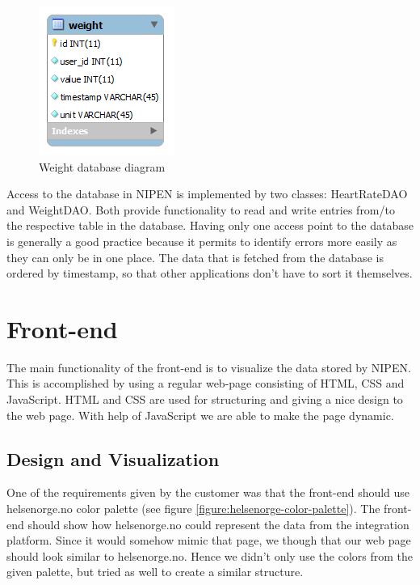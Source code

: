 \begin{figure}[h]
\centering
\includegraphics[scale=1.0]{../Figures/weight-database-diagram.png}
\caption{Weight database diagram}
\label{figure:weight-database-diagram}
\end{figure}

Access to the database in NIPEN is implemented by two classes: HeartRateDAO and WeightDAO.
Both provide functionality to read and write entries from/to the respective table in the database.
Having only one access point to the database is generally a good practice because it permits to
identify errors more easily as they can only be in one place.
The data that is fetched from the database is ordered by timestamp, so that other applications
don't have to sort it themselves.



\section{Front-end}
\label{subsec:front-end}

The main functionality of the front-end is to visualize the data stored by NIPEN.
This is accomplished by using a regular web-page consisting of HTML, CSS and JavaScript. HTML and CSS are used for structuring and giving a nice design to the web page. With help of JavaScript we are able to make the page dynamic.

\subsection{Design and Visualization}

One of the requirements given by the customer was that the front-end should use helsenorge.no color palette
(see figure \ref{figure:helsenorge-color-palette}).
The front-end should show how helsenorge.no could represent the data from the integration platform. 
Since it would somehow mimic that page, we though that our web page should look similar to helsenorge.no. 
Hence we didn't only use the colors from the given palette, but tried as well to create a similar structure.

